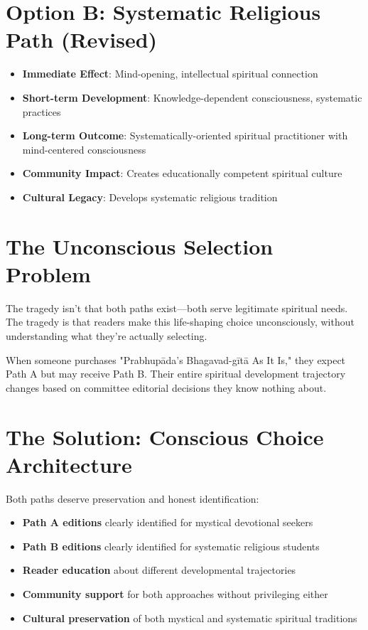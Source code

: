 \documentclass[11pt,twoside]{book}
\begin{document}
\section*{Option B: Systematic Religious Path (Revised)}
\label{sec:org9bab63c}
\begin{itemize}
\item \textbf{\textbf{Immediate Effect}}: Mind-opening, intellectual spiritual connection
\item \textbf{\textbf{Short-term Development}}: Knowledge-dependent consciousness, systematic practices
\item \textbf{\textbf{Long-term Outcome}}: Systematically-oriented spiritual practitioner with mind-centered consciousness
\item \textbf{\textbf{Community Impact}}: Creates educationally competent spiritual culture
\item \textbf{\textbf{Cultural Legacy}}: Develops systematic religious tradition
\end{itemize}
\section*{The Unconscious Selection Problem}
\label{sec:orge2e1c21}

The tragedy isn't that both paths exist—both serve legitimate spiritual needs. The tragedy is that readers make this life-shaping choice unconsciously, without understanding what they're actually selecting.

When someone purchases "Prabhupāda's Bhagavad-gītā As It Is," they expect Path A but may receive Path B. Their entire spiritual development trajectory changes based on committee editorial decisions they know nothing about.
\section*{The Solution: Conscious Choice Architecture}
\label{sec:org97af601}

Both paths deserve preservation and honest identification:

\begin{itemize}
\item \textbf{\textbf{Path A editions}} clearly identified for mystical devotional seekers
\item \textbf{\textbf{Path B editions}} clearly identified for systematic religious students
\item \textbf{\textbf{Reader education}} about different developmental trajectories
\item \textbf{\textbf{Community support}} for both approaches without privileging either
\item \textbf{\textbf{Cultural preservation}} of both mystical and systematic spiritual traditions
\end{itemize}
\end{document}
